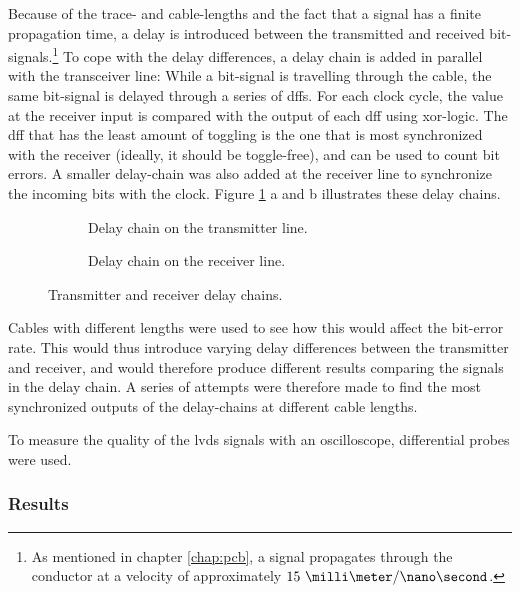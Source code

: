 \documentclass[main.tex]{subfiles}
\begin{document}
Because of the trace- and cable-lengths and the fact that a signal has a finite propagation time, a delay is introduced between the transmitted and received bit-signals.\footnote{As mentioned in chapter \ref{chap:pcb}, a signal propagates through the conductor at a velocity of approximately $15\ \milli\meter/\nano\second$.} To cope with the delay differences, a delay chain is added in parallel with the transceiver line: While a bit-signal is travelling through the cable, the same bit-signal is delayed through a series of \glspl{dff}. For each clock cycle, the value at the receiver input is compared with the output of each \gls{dff} using xor-logic. The \gls{dff} that has the least amount of toggling is the one that is most synchronized with the receiver (ideally, it should be toggle-free), and can be used to count bit errors. A smaller delay-chain was also added at the receiver line to synchronize the incoming bits with the clock. Figure \ref{fig:delaych} a and b illustrates these delay chains.

\begin{figure}
    \centering
    \begin{subfigure}{\textwidth}
        \centering
        \resizebox{1\linewidth}{!}{}
        \caption{Delay chain on the transmitter line.}
    \end{subfigure}

    \begin{subfigure}{0.6\textwidth}
        \centering
        \resizebox{1\linewidth}{!}{}
        \caption{Delay chain on the receiver line.}
    \end{subfigure}
    \caption{Transmitter and receiver delay chains.}
    \label{fig:delaych}
\end{figure}

Cables with different lengths were used to see how this would affect the bit-error rate. This would thus introduce varying delay differences between the transmitter and receiver, and would therefore produce different results comparing the signals in the delay chain. A series of attempts were therefore made to find the most synchronized outputs of the delay-chains at different cable lengths. 

To measure the quality of the \gls{lvds} signals with an oscilloscope, differential probes were used.  

\subsubsection{Results}
\end{document}
